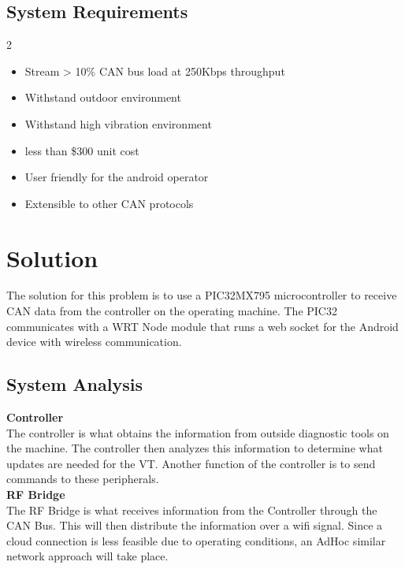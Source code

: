 \documentclass[paper=a4, fontsize=11pt]{scrartcl}
\numberwithin{equation}{section}		%
\numberwithin{figure}{section}			%
\numberwithin{table}{section}				%
\begin{document}
\subsection{System Requirements}
\begin {multicols*}{2}
\begin{itemize}
	\item Stream > 10\%  CAN bus load at 250Kbps throughput
	\item Withstand outdoor environment
	\item Withstand high vibration environment
	\item less than \$300 unit cost
\end{itemize} 

\columnbreak

\begin{itemize}
	\item User friendly for the android operator
	\item Extensible to other CAN protocols
\end{itemize} 
\end{multicols*}
\pagebreak


\section{Solution}
The solution for this problem is to use a PIC32MX795 microcontroller to receive CAN data from the controller on the operating machine. The PIC32 communicates with a WRT Node module that runs a web socket for the Android device with wireless communication.

\subsection{System Analysis}

\textbf{Controller} \\
The controller is what obtains the information from outside diagnostic tools on the machine. The controller then analyzes this information to determine what updates are needed for the VT. Another function of the controller is to send commands to these peripherals. \\

\textbf{RF Bridge} \\
The RF Bridge is what receives information from the Controller through the CAN Bus. This will then distribute the information over a wifi signal. Since a cloud connection is less feasible due to operating conditions,  an AdHoc similar network approach will take place. \\
\end{document}
